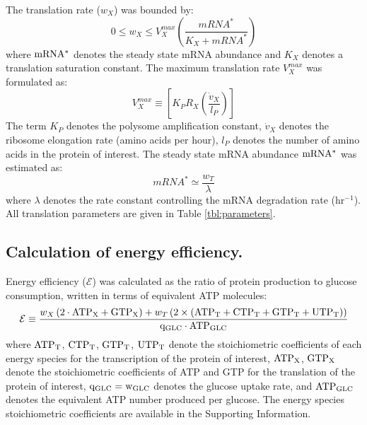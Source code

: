 \documentclass[journal=asbcd6,manuscript=article]{achemso}
\begin{document}
The translation rate ($w_{X}$) was bounded by:
 \begin{equation}
	0\leq w_{X} \leq V_{X}^{max}\left(\frac{mRNA^{*}}{K_{X}+mRNA^{*}}\right)
\end{equation}
where $\rm mRNA^{*}$ denotes the steady state mRNA abundance and $K_{X}$ denotes a translation saturation constant.
The maximum translation rate $V_{X}^{max}$ was formulated as:
\begin{equation}
	V_{X}^{max} \equiv \left[K_{P} R_{X}\left(\frac{\dot{v}_{X}}{l_{P}}\right)\right]
\end{equation}
The term $K_{P}$ denotes the polysome amplification constant,
$\dot{v}_{X}$ denotes the ribosome elongation rate (amino acids per hour),
$l_{P}$ denotes the number of amino acids in the protein of interest.
The steady state mRNA abundance $\rm mRNA^{*}$ was estimated as:
\begin{equation}
	 mRNA^{*}\simeq\frac{w_{T}}{\lambda}
\end{equation}
where $\lambda$ denotes the rate constant controlling the mRNA degradation rate (hr$^{-1}$).
All translation parameters are given in Table \ref{tbl:parameters}.

\subsection*{Calculation of energy efficiency.}
Energy efficiency ($\mathcal{E}$) was calculated as the ratio of protein production to glucose consumption, written in terms of equivalent ATP molecules:
\begin{equation}\label{eqn:energy-efficiency-definition}
	\mathcal{E}\equiv\frac{w_{X}\left(2\cdot\rm {ATP}_{X}+\rm {GTP}_{X}\right)+w_{T}\left(2\times\left(\rm {ATP}_{T}+\rm {CTP}_{T}+\rm {GTP}_{T}+\rm {UTP}_{T}\right) \right)}{\rm{q}_{GLC}\cdot\rm{ATP}_{GLC}}
\end{equation}
where $\rm {ATP}_{T}$, $\rm {CTP}_{T}$, $\rm {GTP}_{T}$, $\rm {UTP}_{T}$ denote the stoichiometric coefficients of each energy species for the transcription of the protein of interest, $\rm {ATP}_{X}$, $\rm {GTP}_{X}$ denote the stoichiometric coefficients of ATP and GTP for the translation of the protein of interest, $\rm{q}_{GLC}=w_{GLC}$ denotes the glucose uptake rate,
and $\rm{ATP}_{GLC}$ denotes the equivalent ATP number produced per glucose.
The energy species stoichiometric coefficients are available in the Supporting Information.
\end{document}
